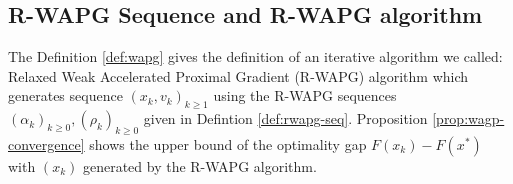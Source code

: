 \documentclass[12pt]{article}
\begin{document}
    \subsection{R-WAPG Sequence and R-WAPG algorithm}\label{ssec:rwpag-seq-and-alg}
        The Definition \ref{def:wapg} gives the definition of an iterative algorithm we called: Relaxed Weak Accelerated Proximal Gradient (R-WAPG) algorithm which generates sequence $(x_k, v_k)_{k \ge 1}$ using the R-WAPG sequences $(\alpha_k)_{k \ge 0}, (\rho_k)_{k \ge 0}$ given in Defintion \ref{def:rwapg-seq}. 
        Proposition \ref{prop:wagp-convergence} shows the upper bound of the optimality gap $F(x_k) - F(x^*)$ with $(x_k)$ generated by the R-WAPG algorithm. 
\end{document}
